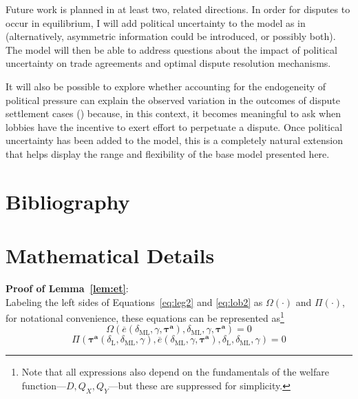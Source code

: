 \documentclass[authoryear, review]{elsarticle}
\newcommand{\ov}{\overline}
\newcommand{\bta}{\bm{\tau^a}}
\newcommand{\ga}{\gamma}
\newcommand{\de}{\delta}
\begin{document}
Future work is planned in at least two, related directions. In order for disputes to occur in equilibrium, I will add political uncertainty to the model as in \citet{buzard2013b} (alternatively, asymmetric information could be introduced, or possibly both). The model will then be able to address questions about the impact of political uncertainty on trade agreements and optimal dispute resolution mechanisms.

It will also be possible to explore whether accounting for the endogeneity of political pressure can explain the observed variation in the outcomes of dispute settlement cases (\citet{buschrein}) because, in this context, it becomes meaningful to ask when lobbies have the incentive to exert effort to perpetuate a dispute. Once political uncertainty has been added to the model, this is a completely natural extension that helps display the range and flexibility of the base model presented here.


\section{Bibliography}

%


\newpage
\appendix

\section{Mathematical Details}
\noindent \textbf{\hypertarget{Cor_et}{Proof of Lemma~\ref{lem:et}}}: \\
Labeling the left sides of Equations~\ref{eq:leg2} and \ref{eq:lob2} as $\Omega\left(\cdot\right)$ and $\Pi\left(\cdot\right)$, for notational convenience, these equations can be represented as\footnote{Note that all expressions also depend on the fundamentals of the welfare function---$D,Q_X,Q_Y$---but these are suppressed for simplicity.}
\begin{equation}
  \Omega\left(\ov{e}\left(\de_\text{ML},\ga,\bta \right),\de_\text{ML},\ga,\bta \right) = 0
	\label{eq:leg3}
\end{equation}
\begin{equation}
  \Pi\left(\bta\left(\de_\text{L},\de_\text{ML},\ga\right),\ov{e}\left(\de_\text{ML},\ga,\bta\right),\de_\text{L},\de_\text{ML},\ga \right) = 0
  \label{eq:lob3}
\end{equation}
\end{document}
